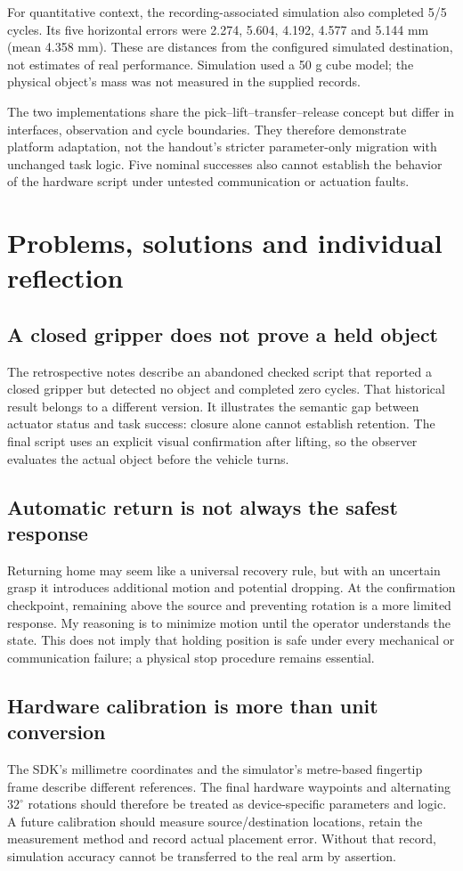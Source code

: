 For quantitative context, the recording-associated simulation also completed 5/5 cycles. Its five horizontal errors were 2.274, 5.604, 4.192, 4.577 and 5.144 mm (mean 4.358 mm). These are distances from the configured simulated destination, not estimates of real performance. Simulation used a 50 g cube model; the physical object's mass was not measured in the supplied records.

The two implementations share the pick--lift--transfer--release concept but differ in interfaces, observation and cycle boundaries. They therefore demonstrate platform adaptation, not the handout's stricter parameter-only migration with unchanged task logic. Five nominal successes also cannot establish the behavior of the hardware script under untested communication or actuation faults.
\clearpage
\section{Problems, solutions and individual reflection}
\subsection{A closed gripper does not prove a held object}
The retrospective notes describe an abandoned checked script that reported a closed gripper but detected no object and completed zero cycles. That historical result belongs to a different version. It illustrates the semantic gap between actuator status and task success: closure alone cannot establish retention. The final script uses an explicit visual confirmation after lifting, so the observer evaluates the actual object before the vehicle turns.
\subsection{Automatic return is not always the safest response}
Returning home may seem like a universal recovery rule, but with an uncertain grasp it introduces additional motion and potential dropping. At the confirmation checkpoint, remaining above the source and preventing rotation is a more limited response. My reasoning is to minimize motion until the operator understands the state. This does not imply that holding position is safe under every mechanical or communication failure; a physical stop procedure remains essential.
\subsection{Hardware calibration is more than unit conversion}
The SDK's millimetre coordinates and the simulator's metre-based fingertip frame describe different references. The final hardware waypoints and alternating $32^\circ$ rotations should therefore be treated as device-specific parameters and logic. A future calibration should measure source/destination locations, retain the measurement method and record actual placement error. Without that record, simulation accuracy cannot be transferred to the real arm by assertion.
